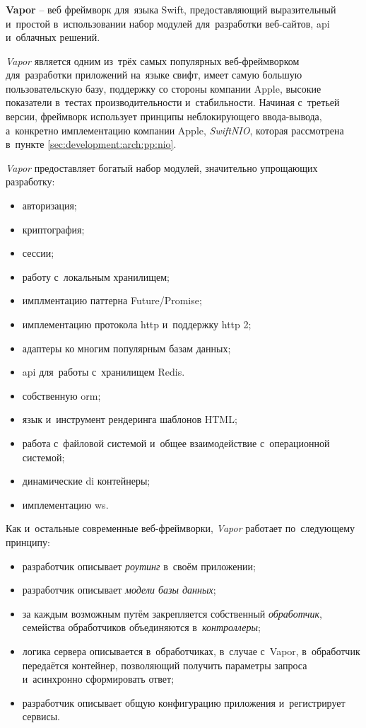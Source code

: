 \subsubsection{}
\label{sec:development:arch:pp:vapor}

\textbf{Vapor} -- веб фреймворк для~языка Swift, предоставляющий выразительный и~простой в~использовании набор модулей для~разработки веб-сайтов, \gls{api} и~облачных решений\cite{vapor:github}.

\textit{Vapor} является одним из~трёх самых популярных веб-фреймворком для~разработки приложений на~языке свифт, имеет самую большую пользовательскую базу, поддержку со стороны компании Apple, высокие показатели в~тестах производительности и~стабильности. Начиная с~третьей версии, фреймворк использует принципы неблокирующего ввода-вывода, а~конкретно имплементацию компании Apple, \textit{SwiftNIO}, которая рассмотрена в~пункте \ref{sec:development:arch:pp:nio}.

\textit{Vapor} предоставляет богатый набор модулей, значительно упрощающих разработку:

\begin{itemize}
	\item авторизация;
	\item криптография;
	\item сессии;
	\item работу с~локальным хранилищем;
	\item имплментацию паттерна Future/Promise;
	\item имплементацию протокола \gls{http} и~поддержку \gls{http} 2;
	\item адаптеры ко многим популярным базам данных;
	\item \gls{api} для~работы с~хранилищем Redis.
	\item собственную \gls{orm};
	\item язык и~инструмент рендеринга шаблонов HTML;
	\item работа с~файловой системой и~общее взаимодействие с~операционной системой;
	\item динамические \gls{di} контейнеры;
	\item имплементацию \gls{ws}.
\end{itemize}

Как и~остальные современные веб-фреймворки, \textit{Vapor} работает по~следующему принципу\cite{server-side-swift}:
\begin{itemize}
	\item разработчик описывает \textit{роутинг} в~своём приложении;
	\item разработчик описывает \textit{модели базы данных};
	\item за каждым возможным путём закрепляется собственный \textit{обработчик}, семейства обработчиков объединяются в~\textit{контроллеры};
	\item логика сервера описывается в~обработчиках, в~случае с~Vapor, в~обработчик передаётся контейнер, позволяющий получить параметры запроса и~асинхронно сформировать ответ;
	\item разработчик описывает общую конфигурацию приложения и~регистрирует сервисы.
\end{itemize}


